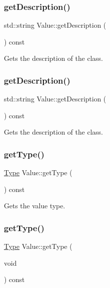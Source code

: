 \subsubsection{\texorpdfstring{get\+Description()}{getDescription()}\hspace{0.1cm}{\footnotesize\ttfamily [1/2]}}
{\footnotesize\ttfamily std\+::string Value\+::get\+Description (\begin{DoxyParamCaption}{ }\end{DoxyParamCaption}) const}

Gets the description of the class. \mbox{\label{classValue_af1c0374c880e1543ff000bc6103c4441}} 
\subsubsection{\texorpdfstring{get\+Description()}{getDescription()}\hspace{0.1cm}{\footnotesize\ttfamily [2/2]}}
{\footnotesize\ttfamily std\+::string Value\+::get\+Description (\begin{DoxyParamCaption}{ }\end{DoxyParamCaption}) const}

Gets the description of the class. \mbox{\label{classValue_a47f2fcdd9f53f9066190f2034078cc10}} 
\subsubsection{\texorpdfstring{get\+Type()}{getType()}\hspace{0.1cm}{\footnotesize\ttfamily [1/2]}}
{\footnotesize\ttfamily \hyperlink{classValue_a669e0b7bc64c01dbec39297930398541}{Type} Value\+::get\+Type (\begin{DoxyParamCaption}{ }\end{DoxyParamCaption}) const\hspace{0.3cm}{\ttfamily [inline]}}

Gets the value type. \mbox{\label{classValue_a47f2fcdd9f53f9066190f2034078cc10}} 
\subsubsection{\texorpdfstring{get\+Type()}{getType()}\hspace{0.1cm}{\footnotesize\ttfamily [2/2]}}
{\footnotesize\ttfamily \hyperlink{classValue_a669e0b7bc64c01dbec39297930398541}{Type} Value\+::get\+Type (\begin{DoxyParamCaption}\item[{void}]{ }\end{DoxyParamCaption}) const\hspace{0.3cm}{\ttfamily [inline]}}

